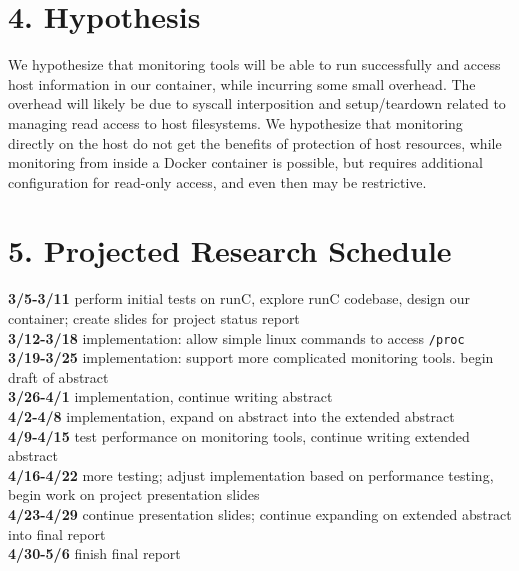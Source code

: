 \documentclass{proc}
\begin{document}
\section*{4. Hypothesis}
We hypothesize that monitoring tools will be able to run successfully and access host information in our container, while incurring some small overhead. The overhead will likely be due to syscall interposition and setup/teardown related to managing read access to host filesystems. We hypothesize that monitoring directly on the host do not get the benefits of protection of host resources, while monitoring from inside a Docker container is possible, but requires additional configuration for read-only access, and even then may be restrictive.

\section*{5. Projected Research Schedule}
\textbf{3/5-3/11} perform initial tests on runC, explore runC codebase, design our container; create slides for project status report\\
\textbf{3/12-3/18} implementation: allow simple linux commands to access \texttt{/proc}\\
\textbf{3/19-3/25} implementation: support more complicated monitoring tools. begin draft of abstract\\
\textbf{3/26-4/1} implementation, continue writing abstract\\
\textbf{4/2-4/8} implementation, expand on abstract into the extended abstract\\
\textbf{4/9-4/15} test performance on monitoring tools, continue writing extended abstract\\
\textbf{4/16-4/22} more testing; adjust implementation based on performance testing, begin work on project presentation slides\\
\textbf{4/23-4/29} continue presentation slides; continue expanding on extended abstract into final report\\
\textbf{4/30-5/6} finish final report






\end{document}
